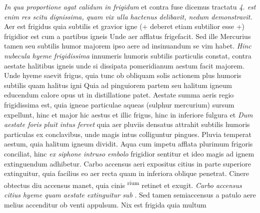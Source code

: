 \textit{In qua proportione agat calidum in frigidum} et contra fuse dicemus tractatu \textit{4. est enim res scitu dignissima, quam vix ulla hactenus delibavit, nedum demonstravit.} Aer est frigidus\protect{} quia subtilis et gravior igne (+ deberet etiam subtilior esse +) frigidior est cum a partibus igneis  Unde aer afflatus frigefacit. Sed ille Mercurius\protect{} tamen seu subtilis humor majorem ipso aere ad insinuandum se vim habet. \textit{Hinc nubecula hyeme frigidissima } innumeris humoris subtilis particulis constat, contra aestate\protect{} halitibus igneis unde si dissipata pomeridianum aestum facit majorem. Unde hyeme\protect{} saevit frigus, quia tunc ob obliquam solis actionem\protect{} plus humoris subtilis quam halitus igni  Quia ad pinguiorem partem seu halitum igneum educendum  calore opus ut in distillatione patet. Aestate summa aeris regio frigidissima est, quia igneae particulae\protect{} aqueas (sulphur\protect{} mercurium\protect{}) sursum expellunt, hinc et major hic aestus et illic frigus, hinc in inferiore fulgura et  \textit{Dum aestate foris pluit intus fervet } quia aer pluviis densatus attrahit subtilis humoris\protect{} particulas ex conclavibus, unde magis intus colliguntur pingues. Pluvia temperat aestum, quia halitum igneum dividit. Aqua cum impetu afflata plurimum frigoris conciliat, hinc \textit{ex siphone\protect{}  intruso embolo } frigidior sentitur et ideo magis ad ignem extinguendum adhibetur. Carbo\protect{} accensus aeri expositus citius in parte superiore extinguitur, quia facilius eo aer recta quam in inferiora oblique penetrat. Cinere\protect{} obtectus diu accensus manet, quia cinis \mercury\textsuperscript{rium}\protect{} retinet et exugit. \textit{Carbo accensus citius hyeme quam aestate extinguitur sub }. Sed tamen semiaccensus a patulo aere melius accenditur ob venti appulsum. Nix est frigida quia multum 
